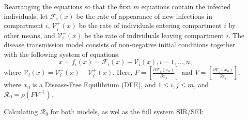\documentclass[a4paper,fleqn]{cas-dc}
\begin{document}
Rearranging the equations so that the first $m$ equations 
contain the infected individuals, let ${\mathcal F}_i(x)$ be the 
rate of appearance of new infections in compartment $i$, 
${\mathcal V}_i^+(x)$ be the rate of individuals entering 
compartment $i$ by other means, and ${\mathcal V}_i^-(x)$ 
be the rate of individuals leaving compartment $i$. The disease 
transmission model consists of non-negative initial conditions 
together with the following system of equations:
$$\dot{x}=f_i(x)={\mathcal F}_i(x)-{\mathcal V}_i(x), i=1,\ldots, n,$$
where ${\mathcal V}_i (x) = {\mathcal V}_i^{-}(x) - {\mathcal V}_i^+(x)$. 
Here, 
$F=\left[\frac{\partial {\mathcal F}_i (x_0)}{\partial x_j}\right]$ 
and $V=\left[\frac{\partial {\mathcal V}_i (x_0) }{\partial x_j}\right]$, 
where $x_0$ is a Disease-Free Equilibrium (DFE), and $1\leq i,j \leq m$, and $\mathcal{R}_0 = \rho(FV^{-1})$. 

Calculating $\mathcal{R}_0$ for both models, as wel as the full system SIR/SEI:
\end{document}
